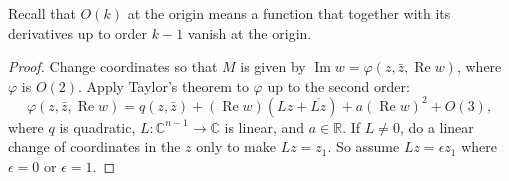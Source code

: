 \documentclass[12pt,openany]{book}
\renewcommand{\Re}{\operatorname{Re}}
\renewcommand{\Im}{\operatorname{Im}}
\newcommand{\C}{{\mathbb{C}}}
\newcommand{\R}{{\mathbb{R}}}
\theoremstyle{plain}
\theoremstyle{remark}
\theoremstyle{definition}
\theoremstyle{exercise}
\theoremstyle{example}
\begin{document}
Recall that $O(k)$ at the origin means
a function that together with its derivatives up to order $k-1$ vanish
at the origin.

\begin{proof}
Change coordinates so that $M$ is given by
$\Im w = \varphi(z,\bar{z},\Re w)$,  where $\varphi$ is $O(2)$.
Apply Taylor's theorem to $\varphi$ up to the second order:
\begin{equation*}
\varphi(z,\bar{z},\Re w) = q(z,\bar{z}) + (\Re w) (Lz + \overline{Lz}) +
a {(\Re w)}^2 +
O(3) ,
\end{equation*}
where $q$ is quadratic, $L \colon \C^{n-1} \to \C$ is linear, and $a \in \R$.
If $L
\not= 0$, do
a linear change of coordinates in the $z$ only to make $Lz = z_1$.  So
assume $Lz = \epsilon z_1$ where $\epsilon = 0$ or $\epsilon =
1$. 


\end{proof}
\end{document}
